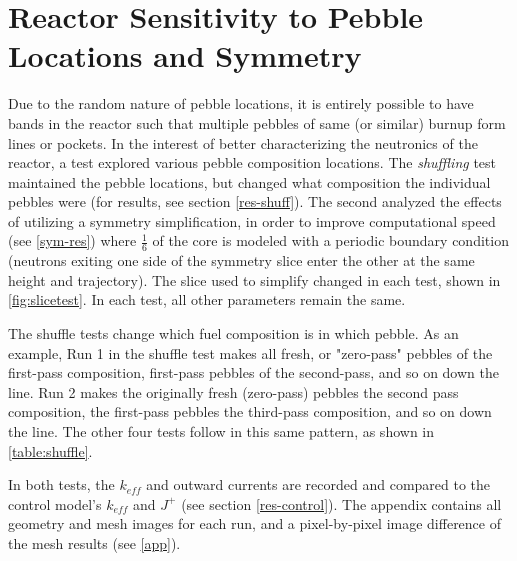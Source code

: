 \section{Reactor Sensitivity to Pebble Locations and Symmetry}

Due to the random nature of pebble locations, it is entirely possible to have bands in the reactor such that multiple pebbles of same (or similar) burnup form lines or pockets.  In the interest of better characterizing the neutronics of the reactor, a test explored various pebble composition locations.  The \emph{shuffling} test maintained the pebble locations, but changed what composition the individual pebbles were (for results, see section \autoref{res-shuff}).  The second analyzed the effects of utilizing a symmetry simplification, in order to improve computational speed (see \autoref{sym-res}) where $\frac{1}{6}$ of the core is modeled with a periodic boundary condition (neutrons exiting one side of the symmetry slice enter the other at the same height and trajectory).  The slice used to simplify changed in each test, shown in \ref{fig:slicetest}.  In each test, all other parameters remain the same.




The shuffle tests change which fuel composition is in which pebble.  As an example, Run 1 in the shuffle test makes all fresh, or "zero-pass" pebbles of the first-pass composition, first-pass pebbles of the second-pass, and so on down the line.  Run 2 makes the originally fresh (zero-pass) pebbles the second pass composition, the first-pass pebbles the third-pass composition, and so on down the line.  The other four tests follow in this same pattern, as shown in \ref{table:shuffle}.



In both tests, the $k_{eff}$ and outward currents are recorded and compared to the control model's $k_{eff}$ and $J^+$ (see section \autoref{res-control}).  The appendix contains all geometry and mesh images for each run, and a pixel-by-pixel image difference of the mesh results (see \autoref{app}).